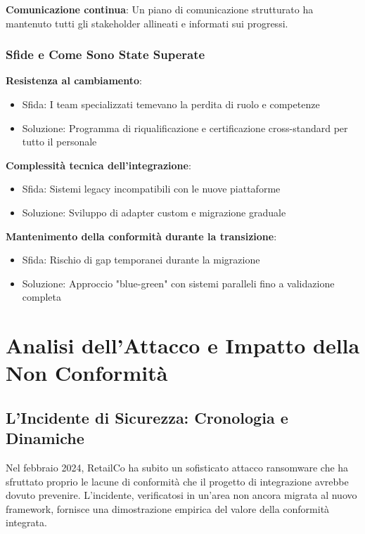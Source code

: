 \textbf{Comunicazione continua}: Un piano di comunicazione strutturato ha mantenuto tutti gli stakeholder allineati e informati sui progressi.

\subsubsection{\texorpdfstring{Sfide e Come Sono State Superate}{4.7.4.2 - Sfide e Come Sono State Superate}}

\textbf{Resistenza al cambiamento}: 
\begin{itemize}
    \item Sfida: I team specializzati temevano la perdita di ruolo e competenze
    \item Soluzione: Programma di riqualificazione e certificazione cross-standard per tutto il personale
\end{itemize}

\textbf{Complessità tecnica dell'integrazione}:
\begin{itemize}
    \item Sfida: Sistemi legacy incompatibili con le nuove piattaforme
    \item Soluzione: Sviluppo di adapter custom e migrazione graduale
\end{itemize}

\textbf{Mantenimento della conformità durante la transizione}:
\begin{itemize}
    \item Sfida: Rischio di gap temporanei durante la migrazione
    \item Soluzione: Approccio "blue-green" con sistemi paralleli fino a validazione completa
\end{itemize}

\section{\texorpdfstring{Analisi dell'Attacco e Impatto della Non Conformità}{4.8 - Analisi dell'Attacco e Impatto della Non Conformità}}
\label{sec:4.8_analisi_attacco}

\subsection{\texorpdfstring{L'Incidente di Sicurezza: Cronologia e Dinamiche}{4.8.1 - L'Incidente di Sicurezza: Cronologia e Dinamiche}}
\label{subsec:4.8.1_incidente}

Nel febbraio 2024, RetailCo ha subito un sofisticato attacco ransomware che ha sfruttato proprio le lacune di conformità che il progetto di integrazione avrebbe dovuto prevenire. L'incidente, verificatosi in un'area non ancora migrata al nuovo framework, fornisce una dimostrazione empirica del valore della conformità integrata.

